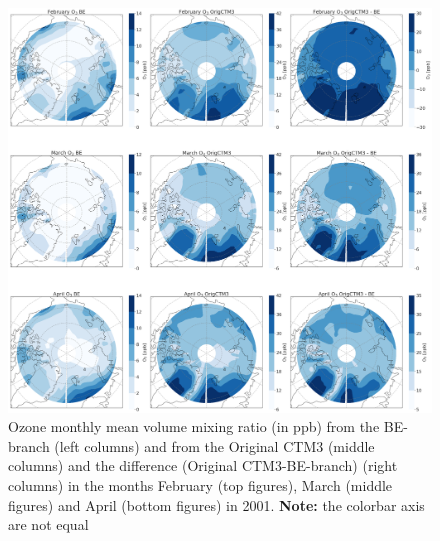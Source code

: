 \begin{figure}[h]
    \centering
    \includegraphics[width = \linewidth]{Chapter6_Results/images/Orig_BE_comp/polar_VMRperc_FebApr_2001.png}
    \caption{Ozone monthly mean volume mixing ratio (in ppb) from the BE-branch (left columns) and from the Original CTM3 (middle columns) and the difference (Original CTM3-BE-branch) (right columns) in the months February (top figures), March (middle figures) and April (bottom figures) in 2001. \textbf{Note:} the colorbar axis are not equal}
    \label{fig:BE_origPD_vmrperc_FebApr}
\end{figure}